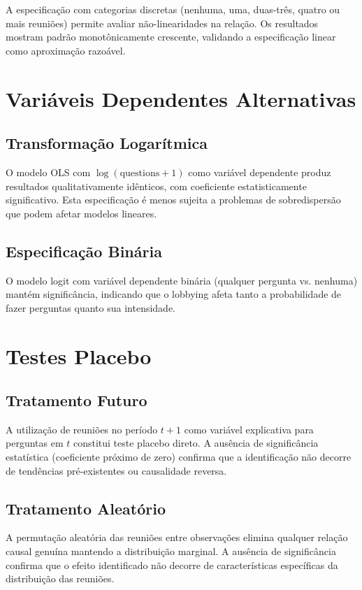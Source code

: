 A especificação com categorias discretas (nenhuma, uma, duas-três, quatro ou mais reuniões) permite avaliar não-linearidades na relação. Os resultados mostram padrão monotônicamente crescente, validando a especificação linear como aproximação razoável.

\section{Variáveis Dependentes Alternativas}

\subsection{Transformação Logarítmica}

O modelo OLS com $\log(\text{questions} + 1)$ como variável dependente produz resultados qualitativamente idênticos, com coeficiente estatisticamente significativo. Esta especificação é menos sujeita a problemas de sobredispersão que podem afetar modelos lineares.

\subsection{Especificação Binária}

O modelo logit com variável dependente binária (qualquer pergunta vs. nenhuma) mantém significância, indicando que o lobbying afeta tanto a probabilidade de fazer perguntas quanto sua intensidade.

\section{Testes Placebo}

\subsection{Tratamento Futuro}

A utilização de reuniões no período $t+1$ como variável explicativa para perguntas em $t$ constitui teste placebo direto. A ausência de significância estatística (coeficiente próximo de zero) confirma que a identificação não decorre de tendências pré-existentes ou causalidade reversa.

\subsection{Tratamento Aleatório}

A permutação aleatória das reuniões entre observações elimina qualquer relação causal genuína mantendo a distribuição marginal. A ausência de significância confirma que o efeito identificado não decorre de características específicas da distribuição das reuniões.

